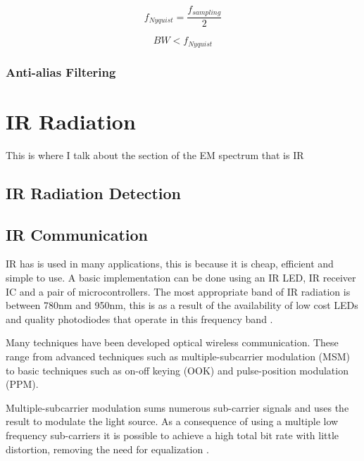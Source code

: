 \[f_{Nyquist} = \frac{f_{sampling}}{2}\]

\begin{equation}
\label{eqn:sampling_frequency}
BW < f_{Nyquist}
\end{equation}


\subsubsection{Anti-alias Filtering}




\section{IR Radiation}
This is where I talk about the section of the EM spectrum that is IR


\subsection{IR Radiation Detection}


\subsection{IR Communication}

IR has is used in many applications, this is because it is cheap, efficient and simple to use. A basic implementation can be done using an IR LED, IR receiver IC and a pair of microcontrollers. The most appropriate band of IR radiation is between 780nm and 950nm, this is as a result of the availability of low cost LEDs and quality photodiodes that operate in this frequency band \cite{Elgala2011}.

Many techniques have been developed optical wireless communication. These range from advanced techniques such as multiple-subcarrier modulation (MSM) to basic techniques such as on-off keying (OOK) and pulse-position modulation (PPM).

Multiple-subcarrier modulation sums numerous sub-carrier signals and uses the result to modulate the light source. As a consequence of using a multiple low frequency sub-carriers it is possible to achieve a high total bit rate with little distortion, removing the need for equalization \cite{Ohtsuki2003}.

